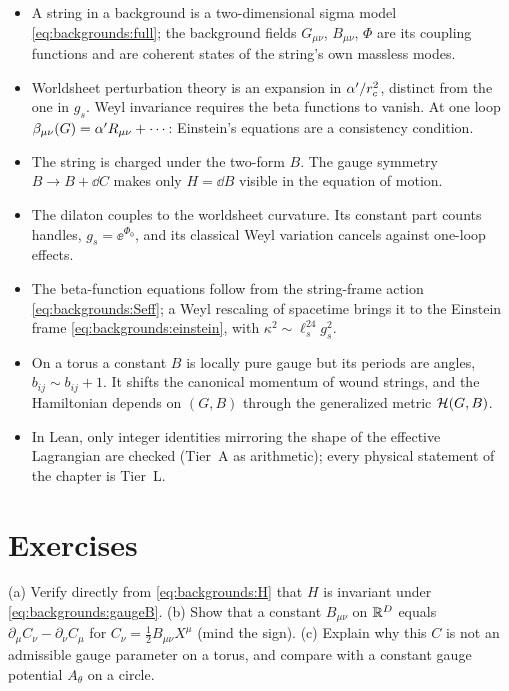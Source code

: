 \begin{summarybox}
\begin{itemize}[leftmargin=*,itemsep=2pt]
\item A string in a background is a two-dimensional sigma model
  \eqref{eq:backgrounds:full}; the background fields $G_{\mu\nu}$, $B_{\mu\nu}$, $\Phi$ are its
  coupling functions and are coherent states of the string's own massless modes.
\item Worldsheet perturbation theory is an expansion in $\alpha'/r_c^2$, distinct from the one in
  $g_s$. Weyl invariance requires the beta functions to vanish. At one loop
  $\beta_{\mu\nu}(G)=\alpha' R_{\mu\nu}+\cdots$: Einstein's equations are a consistency condition.
\item The string is charged under the two-form $B$. The gauge symmetry $B\to B+\dd C$ makes
  only $H=\dd B$ visible in the equation of motion.
\item The dilaton couples to the worldsheet curvature. Its constant part counts handles,
  $g_s=\ee^{\Phi_0}$, and its classical Weyl variation cancels against one-loop effects.
\item The beta-function equations follow from the string-frame action
  \eqref{eq:backgrounds:Seff}; a Weyl rescaling of spacetime brings it to the Einstein frame
  \eqref{eq:backgrounds:einstein}, with $\kappa^2\sim\ell_s^{24}g_s^2$.
\item On a torus a constant $B$ is locally pure gauge but its periods are angles,
  $b_{ij}\sim b_{ij}+1$. It shifts the canonical momentum of wound strings, and the
  Hamiltonian depends on $(G,B)$ through the generalized metric $\mathcal{H}(G,B)$.
\item In Lean, only integer identities mirroring the shape of the effective Lagrangian are
  checked (Tier~A as arithmetic); every physical statement of the chapter is Tier~L.
\end{itemize}
\end{summarybox}

\section*{Exercises}

\begin{exercise}[$\star$]\label{exr:backgrounds:gauge}
(a) Verify directly from \eqref{eq:backgrounds:H} that $H$ is invariant under
\eqref{eq:backgrounds:gaugeB}. (b) Show that a constant $B_{\mu\nu}$ on $\mathbb{R}^D$ equals
$\partial_\mu C_\nu-\partial_\nu C_\mu$ for $C_\nu=\tfrac12B_{\mu\nu}X^\mu$ (mind the sign).
(c) Explain why this $C$ is not an admissible gauge parameter on a torus, and compare with a
constant gauge potential $A_\theta$ on a circle.
\end{exercise}

